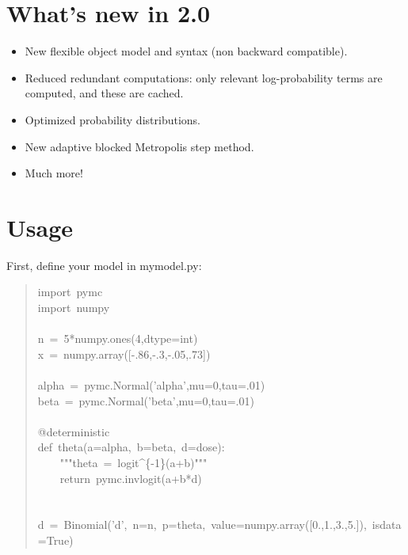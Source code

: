 
\hypertarget{what-s-new-in-2-0}{}
\section*{What's new in 2.0}
\label{what-s-new-in-2-0}
\begin{itemize}
\item {} 
New flexible object model and syntax (non backward compatible).

\item {} 
Reduced redundant computations: only relevant log-probability terms are
computed, and these are cached.

\item {} 
Optimized probability distributions.

\item {} 
New adaptive blocked Metropolis step method.

\item {} 
Much more!

\end{itemize}



\hypertarget{usage}{}
\section*{Usage}
\label{usage}

First, define your model in mymodel.py:
\begin{quote}{\ttfamily \raggedright \noindent
import~pymc~\\
import~numpy~\\
~\\
n~=~5*numpy.ones(4,dtype=int)~\\
x~=~numpy.array({[}-.86,-.3,-.05,.73{]})~\\
~\\
alpha~=~pymc.Normal('alpha',mu=0,tau=.01)~\\
beta~=~pymc.Normal('beta',mu=0,tau=.01)~\\
~\\
@deterministic~\\
def~theta(a=alpha,~b=beta,~d=dose):~\\
~~~~"{}"{}"theta~=~logit{\textasciicircum}{\{}-1{\}}(a+b)"{}"{}"~\\
~~~~return~pymc.invlogit(a+b*d)~\\
~\\
~\\
d~=~Binomial('d',~n=n,~p=theta,~value=numpy.array({[}0.,1.,3.,5.{]}),~isdata=True)
}\end{quote}

